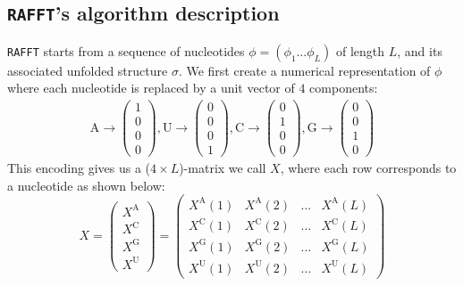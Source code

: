 \subsection{\texttt{RAFFT}'s  algorithm description}
\texttt{RAFFT} starts from a sequence of nucleotides \(\phi=(\phi_1\dots \phi_L)\) of length \(L\), and its associated unfolded structure $\sigma$. We first create a numerical representation of \(\phi\) where each nucleotide is replaced by a unit vector of $4$ components:
\begin{equation}
\begin{split}
\text{A} \rightarrow \begin{pmatrix} 1\\ 0\\ 0\\ 0 \end{pmatrix},
\text{U} \rightarrow \begin{pmatrix} 0\\ 0\\ 0\\ 1 \end{pmatrix},
\text{C} \rightarrow \begin{pmatrix} 0\\ 1\\ 0\\ 0 \end{pmatrix},
\text{G} \rightarrow \begin{pmatrix} 0\\ 0\\ 1\\ 0 \end{pmatrix}
\end{split}
\end{equation}
This encoding gives us a (\(4 \times L\))-matrix we call \(X\), where each row corresponds to a nucleotide as shown below:
\begin{equation}
X = \begin{pmatrix} X^{\text{A}}\\ X^{\text{C}}\\ X^{\text{G}}\\ X^{\text{U}} \end{pmatrix} = \begin{pmatrix} X^{\text{A}}(1) &X^{\text{A}}(2) &\dots &X^{\text{A}}(L) \\ X^{\text{C}}(1) &X^{\text{C}}(2) &\dots &X^{\text{C}}(L)\\ X^{\text{G}}(1) &X^{\text{G}}(2) &\dots &X^{\text{G}}(L)\\ X^{\text{U}}(1) &X^{\text{U}}(2) &\dots &X^{\text{U}}(L) \end{pmatrix}
\end{equation}
